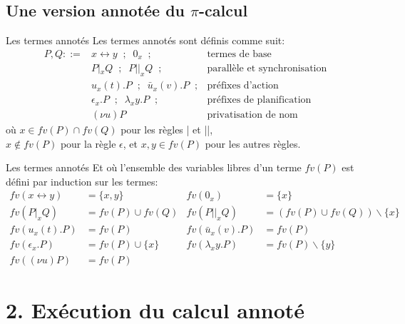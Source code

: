 \documentclass[11pt]{beamer}
\newcommand{\tto}{\leftrightarrow}
\begin{document}
\subsection{Une version annotée du $\pi$-calcul}

\begin{frame}{Les termes annotés}
Les termes annotés sont définis comme suit:
\begin{align*}
P,Q::= & x\tto y\;\;;\;\;0_x\;\;; & \text{termes de base}\\
& P|_xQ\;\;;\;\;P||_xQ\;\;; & \text{parallèle et synchronisation}\\
& u_x(t).P\;\;;\;\;\bar{u}_x(v).P\;\;; & \text{préfixes d'action}\\
& \epsilon_x.P\;\;;\;\;\lambda_xy.P\;\;; & \text{préfixes de planification}\\
& (\nu u)P & \text{privatisation de nom}
\end{align*}
où $x\in fv(P)\cap fv(Q)$ pour les règles | et ||,\\
$x\not\in fv(P)$ pour la règle $\epsilon$, et $x,y\in fv(P)$ pour les autres règles.
\end{frame}

\begin{frame}{Les termes annotés}
Et où l'ensemble des variables libres d'un terme $fv(P)$ est défini par induction sur les termes:
\begin{align*}
fv(x\tto y) &= \{x,y\} & fv(0_x) &= \{x\}\\
fv(P|_xQ) &= fv(P)\cup fv(Q) & fv(P||_xQ) &= (fv(P)\cup fv(Q))\backslash\{x\}\\
fv(u_x(t).P) &= fv(P) & fv(\bar{u}_x(v).P) &= fv(P) \\
fv(\epsilon_x.P) &= fv(P)\cup\{x\} & fv(\lambda_xy.P) &= fv(P)\backslash\{y\}\\
fv((\nu u)P) &= fv(P)
\end{align*}
\end{frame}

\section{2. Exécution du calcul annoté}
\end{document}
